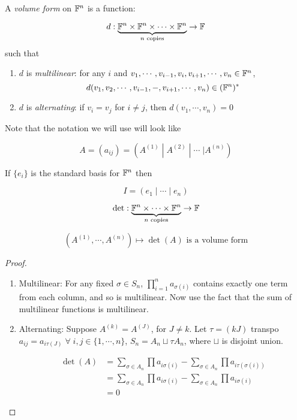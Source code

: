 \documentclass[a4paper]{article}
\begin{document}
\begin{defi}
	A \emph{volume form} on $ \mathbb{F}^{n} $ is a function:
	
	\[ d : \underbrace{\mathbb{F}^{n} \times \mathbb{F}^{n} \times \cdots \times \mathbb{F}^{n}}_{n \text{ copies}} \to \mathbb{F}  \] such that
	
	\begin{enumerate}
		\item $ d $ is \emph{multilinear}: for any $ i $ and $ v_{1},\cdots,v_{i-1},v_{i},v_{i+1},\cdots,v_{n} \in \mathbb{F}^{n} $, \[ d(v_{1},v_{2},\cdots,v_{i-1},-,v_{i+1},\cdots,v_{n}) \in (\mathbb{F}^{n})^{*} \]
		\item $ d $ is \emph{alternating}: if $ v_{i} = v_{j} $ for $ i \neq j $, then $ d(v_{1},\cdots,v_{n}) = 0$
		
	\end{enumerate}
\end{defi}

Note that the notation we will use will look like

\[ A = (a_{ij}) = (A^{(1)} \; | \; A^{(2)} \; | \; \cdots \; | A^{(n)}   ) \]

If $ \{ e_{i} \} $ is the standard basis for $ \mathbb{F}^{n} $ then 

\[ I = (  e_{1} \; | \; \cdots \; | \; e_{n} ) \]


\begin{lemma} 
	\[ \det : \underbrace{\mathbb{F}^{n} \times \cdots \times \mathbb{F}^{n}}_{n \text{ copies}} \to \mathbb{F}  \]
	
	\[ (A^{(1)},\cdots,A^{(n)} ) \mapsto \det (A) \text{ is a volume form} \]
	
\end{lemma}


\begin{proof}
	\begin{enumerate}
		\item Multilinear: For any fixed $ \sigma \in S_{n} $, $ \prod_{i=1}^{n} a_{\sigma(i)} $ contains exactly one term from each column, and so is multilinear. Now use the fact that the sum of multilinear functions is multilinear. 
		
		\item Alternating: Suppose $ A^{(k)} = A^{(J)} $, for $ J \neq k $. Let $ \tau = (k J) $ transpo $ a_{ij} = a_{i \tau(J)} \; \forall \; i,j \in \{ 1,\cdots,n \}$, $ S_{n} = A_{n} \sqcup \tau A_{n} $, where $ \sqcup $ is disjoint union. 
		
		\begin{align*}
		\det(A) & = \sum_{\sigma \in A_{n}} \prod a_{i\sigma(i)} - \sum_{\sigma \in A_{n}} \prod a_{i  \tau(\sigma(i))  } \\
		& = \sum_{\sigma \in A_{n}} \prod a_{i\sigma(i)} - \sum_{\sigma \in A_{n}} \prod a_{i\sigma(i)}\\
		& = 0
		\end{align*}
		
	\end{enumerate}
\end{proof}
\end{document}
